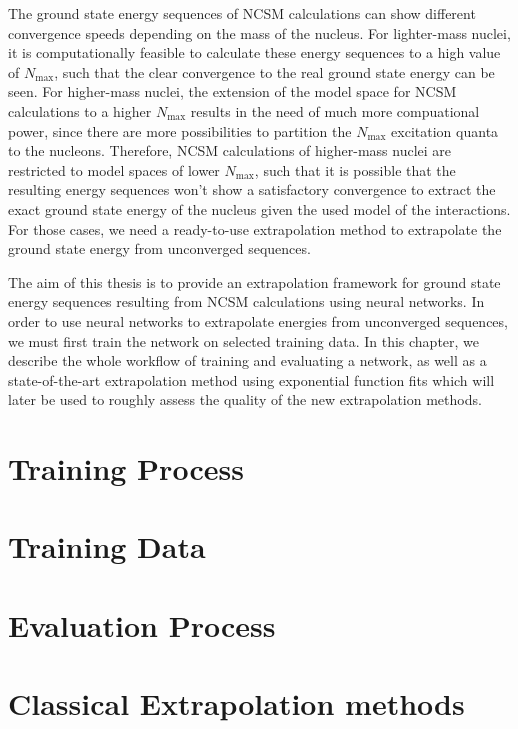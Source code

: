 The ground state energy sequences of NCSM calculations can show different convergence speeds depending on the mass of the nucleus. For lighter-mass nuclei, it is computationally feasible to calculate these energy sequences to a high value of $N_\mathrm{max}$, such that the clear convergence to the real ground state energy can be seen. For higher-mass nuclei, the extension of the model space for NCSM calculations to a higher $N_\mathrm{max}$ results in the need of much more compuational power, since there are more possibilities to partition the $N_\mathrm{max}$ excitation quanta to the nucleons. Therefore, NCSM calculations of higher-mass nuclei are restricted to model spaces of lower $N_\mathrm{max}$, such that it is possible that the resulting energy sequences won't show a satisfactory convergence to extract the exact ground state energy of the nucleus given the used model of the interactions. For those cases, we need a ready-to-use extrapolation method to extrapolate the ground state energy from unconverged sequences.

The aim of this thesis is to provide an extrapolation framework for ground state energy sequences resulting from NCSM calculations using neural networks. In order to use neural networks to extrapolate energies from unconverged sequences, we must first train the network on selected training data. In this chapter, we describe the whole workflow of training and evaluating a network, as well as a state-of-the-art extrapolation method using exponential function fits which will later be used to roughly assess the quality of the new extrapolation methods.

\section{Training Process}

\section{Training Data}
\section{Evaluation Process}
\section{Classical Extrapolation methods}
